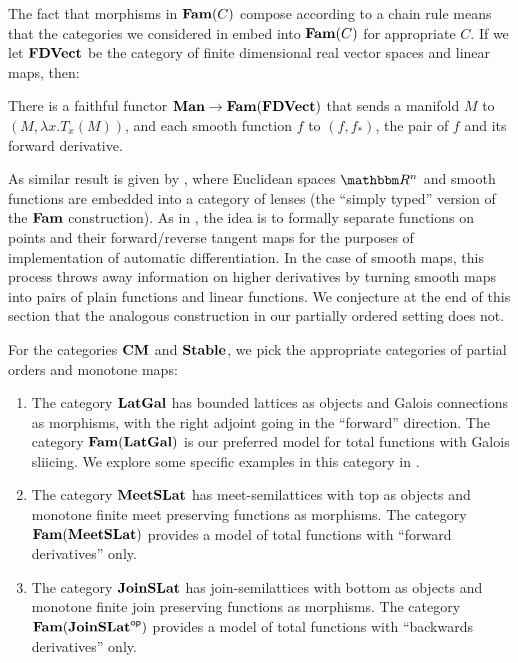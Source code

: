The fact that morphisms in $\mathbf{Fam}(C)$ compose according to a chain rule
means that the categories we considered in 
embed into $\mathbf{Fam}(C)$ for appropriate $C$. If we let $\mathbf{FDVect}$ be the
category of finite dimensional real vector spaces and linear maps,
then:

\begin{proposition}
  \label{prop:embed-manifolds}
  There is a faithful functor $\mathbf{Man} \to \mathbf{Fam}(\mathbf{FDVect})$ that sends a
  manifold $M$ to $(M, \lambda x. T_x(M))$, and each smooth function
  $f$ to $(f, f_*)$, the pair of $f$ and its forward derivative.
\end{proposition}

As similar result is given by \citet{cruttwell2022}, where Euclidean
spaces $\RR^n$ and smooth functions are embedded into a category of
lenses (the ``simply typed'' version of the $\mathbf{Fam}$ construction). As
in \citet{vakar22}, the idea is to formally separate functions on
points and their forward/reverse tangent maps for the purposes of
implementation of automatic differentiation. In the case of smooth
maps, this process throws away information on higher derivatives by
turning smooth maps into pairs of plain functions and linear
functions. We conjecture at the end of this section that the analogous
construction in our partially ordered setting does not.

For the categories $\mathbf{CM}$ and $\mathbf{Stable}$, we pick the appropriate
categories of partial orders and monotone maps:

\begin{enumerate}
\item The category $\mathbf{LatGal}$ has bounded lattices as objects and
  Galois connections as morphisms, with the right adjoint going in the
  ``forward'' direction. The category $\mathbf{Fam}(\mathbf{LatGal})$ is our preferred
  model for total functions with Galois sliicing. We explore some
  specific examples in this category in .
\item The category $\mathbf{MeetSLat}$ has meet-semilattices with top as
  objects and monotone finite meet preserving functions as
  morphisms. The category $\mathbf{Fam}(\mathbf{MeetSLat})$ provides a model of
  total functions with ``forward derivatives'' only.
\item The category $\mathbf{JoinSLat}$ has join-semilattices with bottom as
  objects and monotone finite join preserving functions as
  morphisms. The category $\mathbf{Fam}(\mathbf{JoinSLat}^{\mathsf{op}})$ provides a model of
  total functions with ``backwards derivatives'' only.
\end{enumerate}

